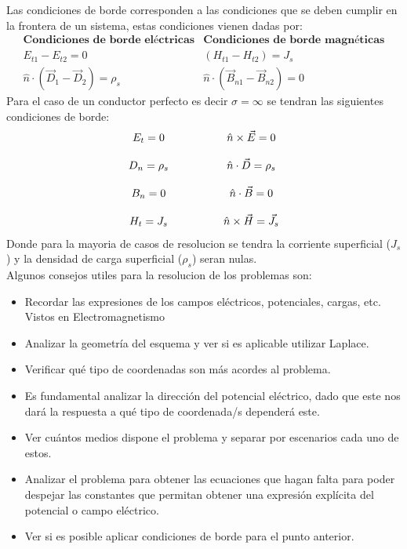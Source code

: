 Las condiciones de borde corresponden a las condiciones que se deben cumplir en la frontera de un sistema, estas condiciones vienen dadas por:
\begin{equation}
    \begin{array}{c|c}
    \textbf{Condiciones de borde eléctricas} & \textbf{Condiciones de borde magnéticas} \\[8pt]
    E_{t1} - E_{t2} = 0 & (H_{t1} - H_{t2}) = J_s \\[10pt]
    \hat{n} \cdot (\vec{D}_1 - \vec{D}_2) = \rho_s & \hat{n} \cdot (\vec{B}_{n1} - \vec{B}_{n2}) = 0
    \end{array}
\end{equation}
Para el caso de un conductor perfecto es decir $\sigma = \infty$ se tendran las siguientes condiciones de borde:
\begin{equation}
    \begin{array}{c c}
        E_t = 0 \quad\quad\quad\quad & \hat{n} \times \vec{E} = 0 \\[12pt]
        D_n = \rho_s \quad\quad\quad\quad & \hat{n} \cdot \vec{D} = \rho_s \\[12pt]
        B_n = 0 \quad\quad\quad\quad & \hat{n} \cdot \vec{B} = 0 \\[12pt]
        H_t = J_s \quad\quad\quad\quad & \hat{n} \times \vec{H} = \vec{J}_s
    \end{array}
\end{equation}
Donde para la mayoria de casos de resolucion se tendra la corriente superficial ($J_s$) y la densidad de carga superficial ($\rho_s$) seran nulas.\\

Algunos consejos utiles para la resolucion de los problemas son:
\begin{itemize}
    \item Recordar las expresiones de los campos eléctricos, potenciales, cargas, etc. Vistos en Electromagnetismo
    \item Analizar la geometría del esquema y ver si es aplicable utilizar Laplace.
    \item Verificar qué tipo de coordenadas son más acordes al problema.
    \item Es fundamental analizar la dirección del potencial eléctrico, dado que este nos dará la respuesta a qué tipo de coordenada/s dependerá este.
    \item Ver cuántos medios dispone el problema y separar por escenarios cada uno de estos.
    \item Analizar el problema para obtener las ecuaciones que hagan falta para poder despejar las constantes que permitan obtener una expresión explícita del potencial o campo eléctrico.
    \item Ver si es posible aplicar condiciones de borde para el punto anterior.
\end{itemize}
\newpage

